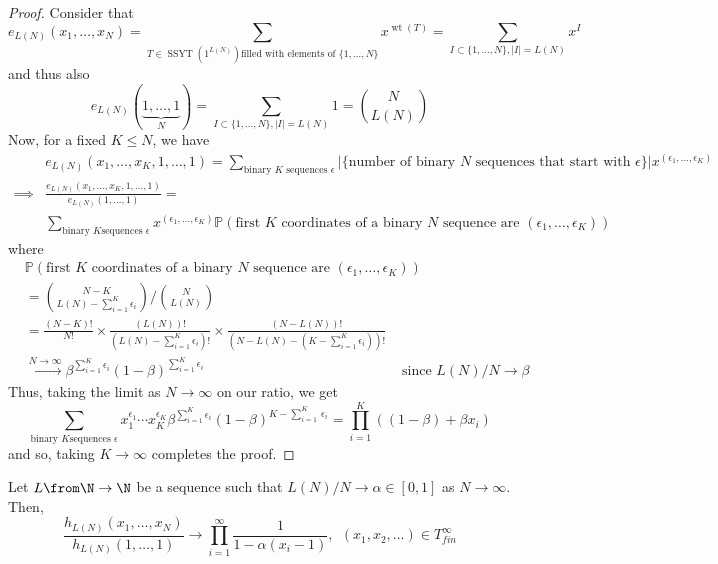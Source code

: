 \documentclass[11pt,leqno,oneside]{amsart}
\numberwithin{thm}{section}
\newcommand{\T}{T} %
\DeclareMathOperator{\SSYT}{SSYT}
\DeclareMathOperator{\wt}{wt}
\renewcommand{\P}{\mathbb{P}} %
\begin{document}
\begin{proof}
  Consider that \[
    e_{L(N)}(x_1, \ldots, x_N) = \sum_{T \in \SSYT(1^{L(N)}) \text{filled
        with elements of }\{1, \ldots, N\}} x^{\wt(T)} = \sum_{I \subset \{1,\ldots,N\}, |I| =
    L(N)} x^{I}
  \]
  and thus also \[
    e_{L(N)}(\underbrace{1, \ldots, 1}_{N}) = \sum_{I \subset
      \{1,\ldots,N\}, |I|=L(N)} 1 = \binom{N}{L(N)}
  \]
  Now, for a fixed \(K \leq N\), we have
  \begin{align*}
    & e_{L(N)}(x_1, \ldots, x_K, 1, \ldots, 1)
    = \sum_{\text{binary }K\text{ sequences } \epsilon}
    |\{\text{number of binary }N\text{ sequences that start with
      }\epsilon\}| x^{(\epsilon_1, \ldots, \epsilon_K)} 
     \\
    \implies & \frac{e_{L(N)}(x_1, \ldots, x_K, 1, \ldots,
    1)}{e_{L(N)}(1,\ldots,1)} =\\
    & \sum_{\text{binary }K\text{
    sequences }\epsilon} x^{(\epsilon_1,\ldots,\epsilon_K)} \P(\text{first
    }K\text{ coordinates of 
    a binary }N\text{ sequence are }(\epsilon_1, \ldots, \epsilon_K))
  \end{align*}
  where
  \begin{align*}
    & \P(\text{first
    }K\text{ coordinates of 
    a binary } N \text{ sequence are }(\epsilon_1, \ldots,
      \epsilon_K)) \\ & = 
  \binom{N-K}{L(N)-\sum_{i=1}^K \epsilon_i} / \binom{N}{L(N)} \\
   & = \frac{(N-K)!}{N!} \times \frac{(L(N))!}{(L(N)-\sum_{i=1}^K
    \epsilon_i)!} \times \frac{(N-L(N))!}{(N-L(N)-(K-\sum_{i=1}^K
     \epsilon_i))!} \\
  & \overset{N \to \infty}{\longrightarrow} \beta^{\sum_{i=1}^K
    \epsilon_i} (1-\beta)^{\sum_{i=1}^K 
    \epsilon_i} & \text{ since } L(N)/N \to \beta
  \end{align*}
  Thus, taking the limit as \(N \to \infty\) on our ratio, we get \[
    \sum_{\text{binary } K \text{sequences }\epsilon}
    x_1^{\epsilon_1} \cdots x_K^{\epsilon_K} \beta^{\sum_{i=1}^K
      \epsilon_i} (1-\beta)^{K-\sum_{i=1}^K\ \epsilon_i} =
    \prod_{i=1}^K ((1-\beta) + \beta x_i)
  \]
  and so, taking \(K \to \infty\) completes the proof.
\end{proof}
\begin{prop}
  Let \(L \from \N \to \N\) be a sequence such that \(L(N)/N \to
  \alpha \in [0,1]\) as \(N \to \infty\). Then, \[
    \frac{h_{L(N)}(x_1, \ldots, x_N)}{h_{L(N)}(1, \ldots, 1)} \to
    \prod_{i=1}^\infty \frac{1}{1-\alpha(x_i-1)}, \ \ (x_1, x_2,
    \ldots) \in \T^\infty_{fin}
  \]
\end{prop}
\end{document}
